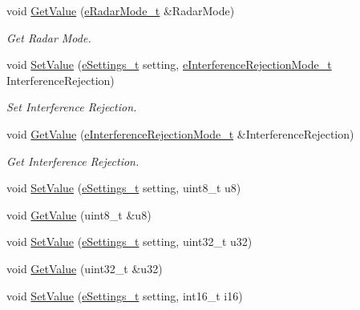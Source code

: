 \begin{DoxyCompactItemize}
void \mbox{\hyperlink{struct_quantum_lib_1_1_setting_data__t_ab53eb949027f8789ad32988ca2e7c6f4}{Get\+Value}} (\mbox{\hyperlink{namespace_quantum_lib_ade0390db62ad71cd1a56b97245d00619}{e\+Radar\+Mode\+\_\+t}} \&Radar\+Mode)
\begin{DoxyCompactList}\small\item\em Get Radar Mode. \end{DoxyCompactList}\item 
void \mbox{\hyperlink{struct_quantum_lib_1_1_setting_data__t_ad795a01c12c4e746839166a1ac47bb79}{Set\+Value}} (\mbox{\hyperlink{namespace_quantum_lib_acc8124e3e65bca4aa798d03a55e3d54c}{e\+Settings\+\_\+t}} setting, \mbox{\hyperlink{namespace_quantum_lib_a7dffda270c051259ba5338455f89b350}{e\+Interference\+Rejection\+Mode\+\_\+t}} Interference\+Rejection)
\begin{DoxyCompactList}\small\item\em Set Interference Rejection. \end{DoxyCompactList}\item 
void \mbox{\hyperlink{struct_quantum_lib_1_1_setting_data__t_a62bd124d71f01626a695f68f0e3a8acf}{Get\+Value}} (\mbox{\hyperlink{namespace_quantum_lib_a7dffda270c051259ba5338455f89b350}{e\+Interference\+Rejection\+Mode\+\_\+t}} \&Interference\+Rejection)
\begin{DoxyCompactList}\small\item\em Get Interference Rejection. \end{DoxyCompactList}\item 
void \mbox{\hyperlink{struct_quantum_lib_1_1_setting_data__t_abaddfeb94d969e0fb53d711edb0a34a0}{Set\+Value}} (\mbox{\hyperlink{namespace_quantum_lib_acc8124e3e65bca4aa798d03a55e3d54c}{e\+Settings\+\_\+t}} setting, uint8\+\_\+t u8)
\item 
void \mbox{\hyperlink{struct_quantum_lib_1_1_setting_data__t_ac6f37994b37ab3207d08f72641251536}{Get\+Value}} (uint8\+\_\+t \&u8)
\item 
void \mbox{\hyperlink{struct_quantum_lib_1_1_setting_data__t_ab5d367111ee227a0072f1264b417b3e4}{Set\+Value}} (\mbox{\hyperlink{namespace_quantum_lib_acc8124e3e65bca4aa798d03a55e3d54c}{e\+Settings\+\_\+t}} setting, uint32\+\_\+t u32)
\item 
void \mbox{\hyperlink{struct_quantum_lib_1_1_setting_data__t_a4907763f451513ae1534357d55ea6d8e}{Get\+Value}} (uint32\+\_\+t \&u32)
\item 
void \mbox{\hyperlink{struct_quantum_lib_1_1_setting_data__t_a9529e7b3d4d53a3496017a36ccbd8474}{Set\+Value}} (\mbox{\hyperlink{namespace_quantum_lib_acc8124e3e65bca4aa798d03a55e3d54c}{e\+Settings\+\_\+t}} setting, int16\+\_\+t i16)

\end{DoxyCompactItemize}
